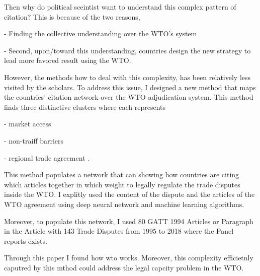 \documentclass[12pt,letterpaper]{article}
\begin{document}
Then why do political sceintist want to understand this complex pattern of citation? This is because of the two reasons,

- Finding the collective understanding over the WTO's system

- Second, upon/toward this understanding, countries design the new strategy to lead more favored result using the WTO.

However, the methods how to deal with this complexity, has been relatively less visited by the scholars. To address this issue, I designed
a new method that maps the countries' citation network over the WTO adjudication system. This method finds three distinctive clusters where each represents

- market access

- non-traiff barriers

- regional trade agreement
.

This method populates a network that can showing how countries are citing which articles together in which weight to legally regulate the trade disputes inside the WTO.
I explitly used the content of the dispute and the articles of the WTO agreement using deep neural network and machine learning algorithms.

Moreover, to populate this network, I used 80 GATT 1994 Articles or Paragraph in the Article with 143 Trade Disputes from 1995 to 2018 where the Panel reports exists.

Through this paper I found how wto works. 
Moreover, this complexity efficietnly caputred by this mthod could address the legal capcity problem in the WTO.

\end{document}

